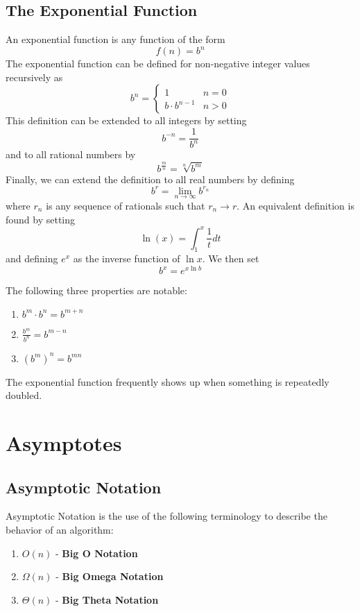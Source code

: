 \documentclass[a4paper]{article}
\begin{document}
 \subsection{The Exponential Function}

  An exponential function is any function of the form \[f(n)=b^n\] The exponential function can be defined for non-negative integer values recursively as \[b^n=\begin{cases}1 & n = 0\\b\cdot b^{n-1} & n>0\end{cases}\] This definition can be extended to all integers by setting \[b^{-n}=\frac{1}{b^n}\] and to all rational numbers by \[b^{\frac{m}{n}}=\sqrt[n]{b^m}\] Finally, we can extend the definition to all real numbers by defining \[b^r=\lim_{n\to\infty}b^{r_n}\] where $r_n$ is any sequence of rationals such that $r_n\to r$. An equivalent definition is found by setting \[\ln(x)=\int_1^x\frac{1}{t}dt\] and defining $e^x$ as the inverse function of $\ln{x}$. We then set \[b^x=e^{x\ln{b}}\]

  The following three properties are notable:
  \begin{enumerate}
  \item $b^m\cdot b^n=b^{m+n}$
  \item $\frac{b^m}{b^n}=b^{m-n}$
  \item $(b^m)^n=b^{mn}$
  \end{enumerate}

The exponential function frequently shows up when something is repeatedly doubled.

\section{Asymptotes}

\subsection{Asymptotic Notation}

Asymptotic Notation is the use of the following terminology to describe the behavior of an algorithm:
\begin{enumerate}
\item $O(n)$ - \textbf{Big O Notation}
\item $\Omega(n)$ - \textbf{Big Omega Notation}
\item $\Theta(n)$ - \textbf{Big Theta Notation}
\end{enumerate}
\end{document}
